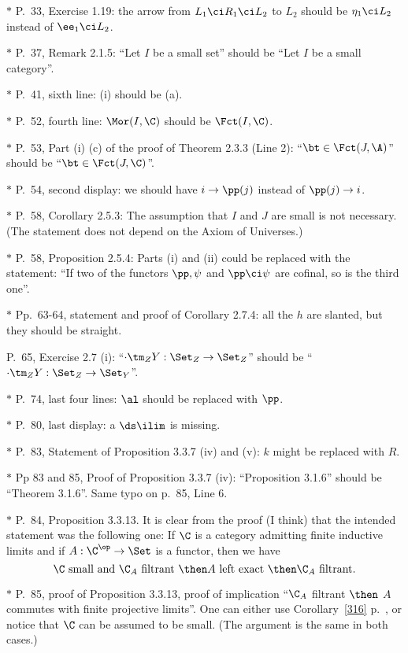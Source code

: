 \documentclass[12pt]{article}
\theoremstyle{remark}
\theoremstyle{definition}
\begin{document}
\nn$*$ P.~33, Exercise 1.19: the arrow from $L_1\ci R_1\ci L_2$ to $L_2$ should be $\eta_1\ci L_2$ instead of $\ee_1\ci L_2$. 

\nn$*$ P.~37, Remark 2.1.5: ``Let $I$ be a small set'' should be ``Let $I$ be a small category''.

\nn$*$ P.~41, sixth line: (i) should be (a). 

\nn$*$ P.~52, fourth line: $\Mor(I,\C)$ should be $\Fct(I,\C)$.

\nn$*$ P.~53, Part (i) (c) of the proof of Theorem 2.3.3 (Line 2): ``$\bt\in\Fct(J,\A)$'' should be ``$\bt\in\Fct(J,\C)$''.

\nn$*$ P.~54, second display: we should have $i\to\pp(j)$ instead of $\pp(j)\to i$.

\nn$*$ P.~58, Corollary 2.5.3: The assumption that $I$ and $J$ are small is not necessary. (The statement does not depend on the Axiom of Universes.) 

\nn$*$ P.~58, Proposition 2.5.4: Parts (i) and (ii) could be replaced with the statement: ``If two of the functors $\pp,\psi$ and $\pp\ci\psi$ are cofinal, so is the third one''.

\nn$*$ Pp.~63-64, statement and proof of Corollary 2.7.4: all the $h$ are slanted, but they should be straight.

\begin{s}
P.~65, Exercise 2.7 (i): ``$\cdot\tm_ZY:\Set_Z\to\Set_Z$'' should be ``$\cdot\tm_ZY:\Set_Z\to\Set_Y$''.
\end{s}

\nn$*$ P.~74, last four lines: $\al$ should be replaced with $\pp$.

\nn$*$ P.~80, last display: a $\ds\ilim$ is missing.

\nn$*$ P.~83, Statement of Proposition 3.3.7 (iv) and (v): $k$ might be replaced with $R$. 

\nn$*$ Pp 83 and 85, Proof of Proposition 3.3.7 (iv): ``Proposition 3.1.6'' should be ``Theorem 3.1.6''. Same typo on p.~85, Line 6.

\nn$*$ P.~84, Proposition 3.3.13. It is clear from the proof (I think) that the intended statement was the following one: If $\C$ is a category admitting finite inductive limits and if $A:\C^{\op}\to\Set$ is a functor, then we have 
$$
\C\text{ small and }\C_A\text{ filtrant }\then A\text{ left exact }\then\C_A\text{ filtrant}.
$$

\nn$*$ P.~85, proof of Proposition 3.3.13, proof of implication ``$\C_A$ filtrant $\then$ $A$ commutes with finite projective limits''. One can either use Corollary~\ref{316} p.~, or notice that $\C$ can be assumed to be small. (The argument is the same in both cases.)
\end{document}
